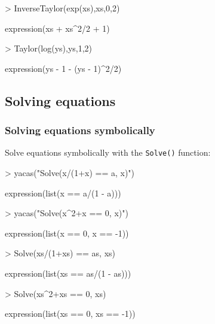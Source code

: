 \documentclass[]{article}
\newcommand{\code}[1]{{\tt #1}}
\begin{document}
\begin{Schunk}
\begin{Sinput}
> InverseTaylor(exp(xs),xs,0,2)
\end{Sinput}
\begin{Soutput}
expression(xs + xs^2/2 + 1)
\end{Soutput}
\begin{Sinput}
> Taylor(log(ys),ys,1,2)
\end{Sinput}
\begin{Soutput}
expression(ys - 1 - (ys - 1)^2/2)
\end{Soutput}
\end{Schunk}

\subsection{Solving equations}


\subsubsection{Solving equations symbolically}

Solve equations symbolically with the \code{Solve()} function:
\begin{Schunk}
\begin{Sinput}
> yacas("Solve(x/(1+x) == a, x)")
\end{Sinput}
\begin{Soutput}
expression(list(x == a/(1 - a)))
\end{Soutput}
\begin{Sinput}
> yacas("Solve(x^2+x == 0, x)")
\end{Sinput}
\begin{Soutput}
expression(list(x == 0, x == -1))
\end{Soutput}
\end{Schunk}

\begin{Schunk}
\begin{Sinput}
> Solve(xs/(1+xs) == as, xs)
\end{Sinput}
\begin{Soutput}
expression(list(xs == as/(1 - as)))
\end{Soutput}
\begin{Sinput}
> Solve(xs^2+xs == 0, xs)
\end{Sinput}
\begin{Soutput}
expression(list(xs == 0, xs == -1))
\end{Soutput}
\end{Schunk}
\end{document}
